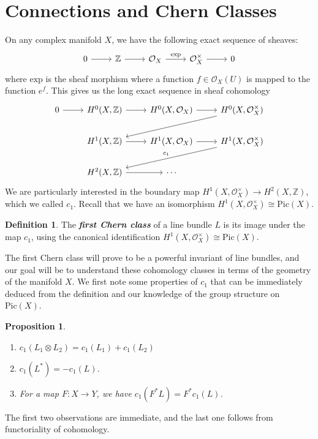 \documentclass[psamsfonts, 12pt]{amsart}
\newtheorem{prop}[thm]{Proposition}
\theoremstyle{definition}
\newtheorem{defn}[thm]{Definition}
\theoremstyle{remark}
\renewcommand{\O}{\mathcal{O}}
\newcommand{\ib}[1]{\textbf{\textit{#1}}}
\newcommand{\Z}{\mathbb{Z}}
\newcommand{\enumbreak}{\ \\ \vspace{-\baselineskip}}
\begin{document}
\section{Connections and Chern Classes}
%
On any complex manifold $X$, we have the following exact sequence of sheaves:
\[\begin{tikzcd}
0 \ar[r] & \Z \ar[r] & \O_X \ar[r, "\mathrm{exp}"] & \O_X^\times \ar[r] & 0
\end{tikzcd}\]
where $\mathrm{exp}$ is the sheaf morphism where a function $f \in \O_X(U)$ is
mapped to the function $e^f$. This gives us the long exact sequence in sheaf
cohomology
\[\begin{tikzcd}
0 \ar[r] & H^0(X, \Z) \ar[r] & H^0(X, \O_X) \ar[r] & H^0(X, \O_X^\times) \ar[dll]\\
& H^1(X, \Z) \ar[r] & H^1(X, \O_X) \ar[r] & H^1(X, \O_X^\times) \ar[dll, "c_1"']\\
& H^2(X, \Z) \ar[r] & \cdots
\end{tikzcd}\]
%
We are particularly interested in the boundary map $H^1(X,\O_X^\times) \to H^2(X, \Z)$,
which we called $c_1$. Recall that we have an isomorphism
$H^1(X,\O_X^\times) \cong \mathrm{Pic}(X)$.
%
\begin{defn}
The \ib{first Chern class} of a line bundle $L$ is its image under the map
$c_1$, using the canonical identification $H^1(X,\O_X^\times) \cong \mathrm{Pic}(X)$.
\end{defn}
%
The first Chern class will prove to be a powerful invariant of line bundles, and
our goal will be to understand these cohomology classes in terms of the geometry
of the manifold $X$. We first note some properties of $c_1$ that can be immediately
deduced from the definition and our knowledge of the group structure on $\mathrm{Pic}(X)$.
%
\begin{prop} \enumbreak
\begin{enumerate}
  \item $c_1(L_1 \otimes L_2) = c_1(L_1) + c_1(L_2)$
  \item $c_1(L^*) = -c_1(L)$.
  \item For a map $F : X \to Y$, we have $c_1(F^*L) = F^*c_1(L)$.
\end{enumerate}
\end{prop}
%
The first two observations are immediate, and the last one follows from functoriality
of cohomology. \\
\end{document}

